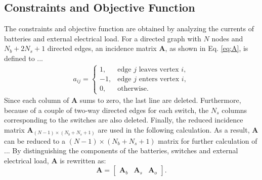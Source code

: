\documentclass{article}
\begin{document}
\subsection{Constraints and Objective Function}

The constraints and objective function are obtained by analyzing the currents of batteries and external electrical load.
For a directed graph with $N$ nodes and $N_b+2N_s+1$ directed edges, an incidence matrix $\bm{A}$, as shown in Eq. \ref{eq:A}, is defined to ... %
\begin{align}\label{eq:A}
    a_{ij}=
    \begin{cases}
        1,  & \text{edge $j$ leaves vertex $i$},\\
        -1, & \text{edge $j$ enters vertex $i$},\\
        0,  & \text{otherwise}.
    \end{cases}
\end{align}
Since each column of $\bm{A}$ sums to zero, the last line are deleted.
Furthermore, because of a couple of two-way directed edges for each switch, the $N_s$ columns corresponding to the switches are also deleted. %
Finally, the reduced incidence matrix $\bm{A}_{(N-1)\times(N_b+N_s+1)}$ are used in the following calculation.
As a result, $\bm{A}$ can be reduced to a $(N-1)\times(N_b+N_s+1)$ matrix for further calculation of ... %
By distinguishing the components of the batteries, switches and external electrical load, $\bm{A}$ is rewritten as:
\begin{equation}
    \bm{A} =
    \begin{bmatrix}
        \bm{A}_b & \bm{A}_s & \bm{A}_o
    \end{bmatrix}.
\end{equation}
\end{document}
